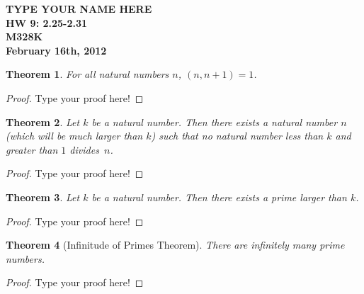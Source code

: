 \documentclass[12pt,leqno]{article}
\numberwithin{equation}{section}
\newtheorem{thm}{Theorem}[section]
\theoremstyle{definition}
\begin{document}
\thispagestyle{plain}
\begin{flushright}
\large{\textbf{TYPE YOUR NAME HERE \\
HW 9: 2.25-2.31\\
M328K \\
February 16th, 2012 \\}}
\end{flushright}

\markboth{}{} \setcounter{section}{0} \baselineskip=18pt

\setcounter{tocdepth}{4}



\setcounter{section}{2}

\setcounter{thm}{31}


\begin{thm}
For all natural numbers $n$, $(n,n + 1) = 1$.
\end{thm}

\begin{proof}[Proof]
Type your proof here!
\end{proof}



\begin{thm}
Let $k$ be a natural number.  Then there exists a natural number $n$
(which will be much larger than $k$) such that no natural number
less than $k$ and greater than $1$ divides~$n$.
\end{thm}

\begin{proof}[Proof]
Type your proof here!
\end{proof}



\begin{thm}
Let $k$ be a natural number. Then there exists a prime larger than
$k$.
\end{thm}

\begin{proof}[Proof]
Type your proof here!
\end{proof}



\begin{thm}[Infinitude of Primes Theorem]
There are infinitely many prime numbers.
\end{thm}

\begin{proof}[Proof]
Type your proof here!
\end{proof}
\end{document}
